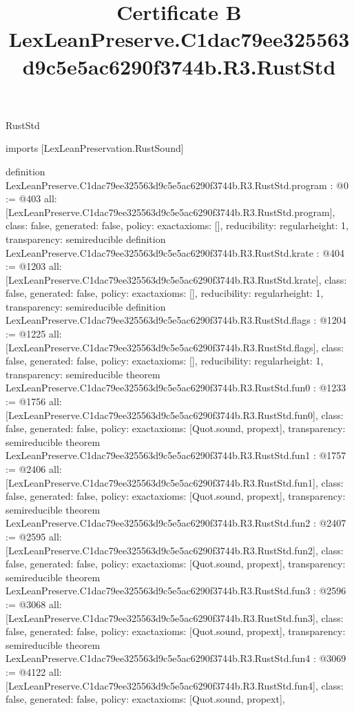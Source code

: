 \begin{lexlean}{RustStd}
\title{Certificate B LexLeanPreserve.C1dac79ee325563d9c5e5ac6290f3744b.R3.RustStd}
\begin{coremodule}
imports [LexLeanPreservation.RustSound]

definition LexLeanPreserve.C1dac79ee325563d9c5e5ac6290f3744b.R3.RustStd.program : @0 := @403 {
  all: [LexLeanPreserve.C1dac79ee325563d9c5e5ac6290f3744b.R3.RustStd.program],
  class: false,
  generated: false,
  policy: exact{axioms: []},
  reducibility: regular{height: 1},
  transparency: semireducible
}
definition LexLeanPreserve.C1dac79ee325563d9c5e5ac6290f3744b.R3.RustStd.krate : @404 := @1203 {
  all: [LexLeanPreserve.C1dac79ee325563d9c5e5ac6290f3744b.R3.RustStd.krate],
  class: false,
  generated: false,
  policy: exact{axioms: []},
  reducibility: regular{height: 1},
  transparency: semireducible
}
definition LexLeanPreserve.C1dac79ee325563d9c5e5ac6290f3744b.R3.RustStd.flags : @1204 := @1225 {
  all: [LexLeanPreserve.C1dac79ee325563d9c5e5ac6290f3744b.R3.RustStd.flags],
  class: false,
  generated: false,
  policy: exact{axioms: []},
  reducibility: regular{height: 1},
  transparency: semireducible
}
theorem LexLeanPreserve.C1dac79ee325563d9c5e5ac6290f3744b.R3.RustStd.fun0 : @1233 := @1756 {
  all: [LexLeanPreserve.C1dac79ee325563d9c5e5ac6290f3744b.R3.RustStd.fun0],
  class: false,
  generated: false,
  policy: exact{axioms: [Quot.sound, propext]},
  transparency: semireducible
}
theorem LexLeanPreserve.C1dac79ee325563d9c5e5ac6290f3744b.R3.RustStd.fun1 : @1757 := @2406 {
  all: [LexLeanPreserve.C1dac79ee325563d9c5e5ac6290f3744b.R3.RustStd.fun1],
  class: false,
  generated: false,
  policy: exact{axioms: [Quot.sound, propext]},
  transparency: semireducible
}
theorem LexLeanPreserve.C1dac79ee325563d9c5e5ac6290f3744b.R3.RustStd.fun2 : @2407 := @2595 {
  all: [LexLeanPreserve.C1dac79ee325563d9c5e5ac6290f3744b.R3.RustStd.fun2],
  class: false,
  generated: false,
  policy: exact{axioms: [Quot.sound, propext]},
  transparency: semireducible
}
theorem LexLeanPreserve.C1dac79ee325563d9c5e5ac6290f3744b.R3.RustStd.fun3 : @2596 := @3068 {
  all: [LexLeanPreserve.C1dac79ee325563d9c5e5ac6290f3744b.R3.RustStd.fun3],
  class: false,
  generated: false,
  policy: exact{axioms: [Quot.sound, propext]},
  transparency: semireducible
}
theorem LexLeanPreserve.C1dac79ee325563d9c5e5ac6290f3744b.R3.RustStd.fun4 : @3069 := @4122 {
  all: [LexLeanPreserve.C1dac79ee325563d9c5e5ac6290f3744b.R3.RustStd.fun4],
  class: false,
  generated: false,
  policy: exact{axioms: [Quot.sound, propext]},
}
\end{coremodule}
\end{lexlean}

